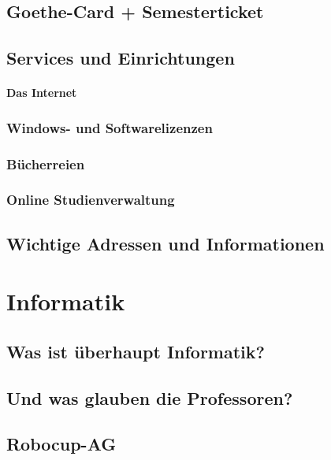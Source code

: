 \documentclass[12pt,a4paper]{scrartcl}
\begin{document}
    \subsection{Goethe-Card + Semesterticket}
    
    
    \subsection{Services und Einrichtungen}
    \paragraph{Das Internet}
    
    \subsubsection*{Windows- und Softwarelizenzen}
    
    \subsubsection*{Bücherreien}
    
	\subsubsection*{Online Studienverwaltung}
    \newpage
    \subsection{Wichtige Adressen und Informationen}
    
\newpage
\section{Informatik}
    \subsection{Was ist \"uberhaupt Informatik?}
    
    \subsection{Und was glauben die Professoren?}
    
    \newpage
	\subsection{Robocup-AG}
    
    \newpage
\end{document}
